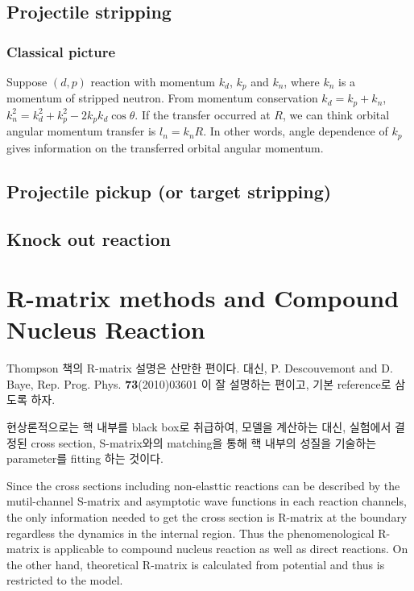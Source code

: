 \documentclass[11pt]{book}
\begin{document}
\section{Projectile stripping}
\subsection{Classical picture}
  Suppose $(d,p)$ reaction with momentum $k_d$, $k_p$ and $k_n$, where $k_n$ is a 
  momentum of stripped neutron. From momentum conservation $k_d=k_p+k_n$,
  $k_n^2=k_d^2+k_p^2-2k_p k_d \cos\theta$. If the transfer occurred at $R$, we can 
  think orbital angular momentum transfer is $l_n=k_n R$.
  In other words, angle dependence of $k_p$ gives information on the transferred orbital
  angular momentum.  
 
\section{Projectile pickup (or target stripping)}

\section{Knock out reaction} 
  
\chapter{R-matrix methods and Compound Nucleus Reaction}

Thompson 책의 R-matrix 설명은 산만한 편이다. 대신, 
P. Descouvemont and D. Baye, Rep. Prog. Phys. {\bf 73}(2010)03601 이 잘 설명하는 편이고,
기본 reference로 삼도록 하자.

현상론적으로는 핵 내부를 black box로 취급하여, 
모델을 계산하는 대신, 실험에서 결정된 cross section, S-matrix와의
matching을 통해 핵 내부의 성질을 기술하는 parameter를 fitting 하는 것이다. 

Since the cross sections including non-elasttic reactions can be described by 
the mutil-channel S-matrix and asymptotic wave functions in each reaction channels,
the only information needed to get the cross section is R-matrix at the boundary
regardless the dynamics in the internal region.
Thus the phenomenological R-matrix is applicable to compound nucleus reaction
as well as direct reactions. On the other hand, 
theoretical R-matrix is calculated from potential
and thus is restricted to the model.  
\end{document}
